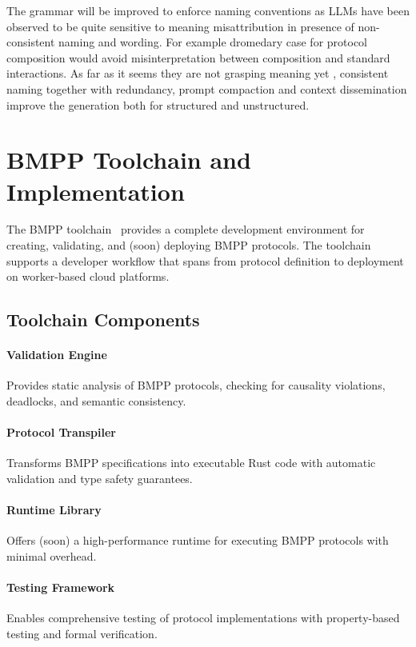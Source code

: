 \documentclass[11pt,a4paper]{article}
\begin{document}
	\noindent The grammar will be improved to enforce naming conventions as LLMs have been observed to be quite sensitive to meaning misattribution in presence of non-consistent naming and wording. For example dromedary case for protocol composition would avoid misinterpretation between composition and standard interactions. As far as it seems they are not grasping meaning yet \cite{dentella2024testing}, consistent naming together with redundancy, prompt compaction and context dissemination improve the generation both for structured and unstructured.
	
	\section{BMPP Toolchain and Implementation}
	\label{sec:implementation}
	
	The BMPP toolchain~\cite{bmpp-agents-rs} provides a complete development environment for creating, validating, and (soon) deploying BMPP protocols. The toolchain supports a developer workflow that spans from protocol definition to deployment on worker-based cloud platforms.
	
	\subsection{Toolchain Components}
	\label{subsec:toolchain}
	
	\paragraph{Validation Engine} Provides static analysis of BMPP protocols, checking for causality violations, deadlocks, and semantic consistency.

	\paragraph{Protocol Transpiler} Transforms BMPP specifications into executable Rust code with automatic validation and type safety guarantees.
	
	\paragraph{Runtime Library} Offers (soon) a high-performance runtime for executing BMPP protocols with minimal overhead.
	
	\paragraph{Testing Framework} Enables comprehensive testing of protocol implementations with property-based testing and formal verification.
	
\end{document}
